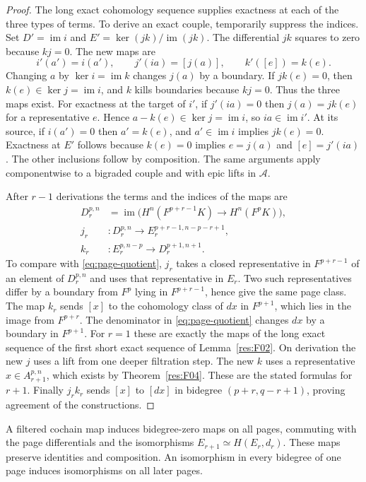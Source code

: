 \begin{proof}
The long exact cohomology sequence supplies exactness at each of the
three types of terms. To derive an exact couple, temporarily suppress
the indices. Set $D'=\operatorname{im}i$ and
$E'=\ker(jk)/\operatorname{im}(jk)$. The differential $jk$ squares to
zero because $kj=0$. The new maps are
\[
 i'(a')=i(a'),\qquad j'(ia)=[j(a)],\qquad k'([e])=k(e).
\]
Changing $a$ by $\ker i=\operatorname{im}k$ changes $j(a)$ by a
boundary. If $jk(e)=0$, then $k(e)\in\ker j=\operatorname{im}i$,
and $k$ kills boundaries because $kj=0$. Thus the three maps exist.
For exactness at the target of $i'$, if $j'(ia)=0$ then
$j(a)=jk(e)$ for a representative $e$. Hence $a-k(e)\in\ker j
=\operatorname{im}i$, so $ia\in\operatorname{im}i'$. At its source,
if $i(a')=0$ then $a'=k(e)$, and $a'\in\operatorname{im}i$ implies
$jk(e)=0$. Exactness at $E'$ follows because $k(e)=0$ implies
$e=j(a)$ and $[e]=j'(ia)$. The other inclusions follow by
composition. The same arguments apply componentwise to a bigraded
couple and with epic lifts in $\mathcal A$.

After $r-1$ derivations the terms and the indices of the maps are
\[
\begin{split}
 D_r^{p,n}
  &=\operatorname{im}\bigl(H^n(F^{p+r-1}K)\longrightarrow
        H^n(F^pK)\bigr),\\
 j_r&\colon D_r^{p,n}\longrightarrow E_r^{p+r-1,n-p-r+1},\\
 k_r&\colon E_r^{p,n-p}\longrightarrow D_r^{p+1,n+1}.
\end{split}
\]
To compare with \eqref{eq:page-quotient}, $j_r$ takes a closed
representative in $F^{p+r-1}$ of an element of $D_r^{p,n}$ and uses
that representative in $E_r$. Two such representatives differ by
a boundary from $F^p$ lying in $F^{p+r-1}$, hence give the same
page class. The map $k_r$ sends $[x]$ to the cohomology class of
$dx$ in $F^{p+1}$, which lies in the image from $F^{p+r}$.
The denominator in \eqref{eq:page-quotient} changes $dx$ by a
boundary in $F^{p+1}$. For $r=1$ these are exactly the maps of the
long exact sequence of the first short exact sequence of
Lemma~\ref{res:F02}. On derivation the new $j$ uses a lift from
one deeper filtration step. The new $k$ uses a representative
$x\in A_{r+1}^{p,n}$, which exists by Theorem~\ref{res:F04}.
These are the stated formulas for $r+1$. Finally $j_rk_r$
sends $[x]$ to $[dx]$ in bidegree $(p+r,q-r+1)$, proving
agreement of the constructions.
\end{proof}

\begin{proposition}
\label{res:F06}
A filtered cochain map induces bidegree-zero maps on all pages,
commuting with the page differentials and the isomorphisms
$E_{r+1}\simeq H(E_r,d_r)$. These maps preserve identities and
composition. An isomorphism in every bidegree of one page induces
isomorphisms on all later pages.
\end{proposition}

